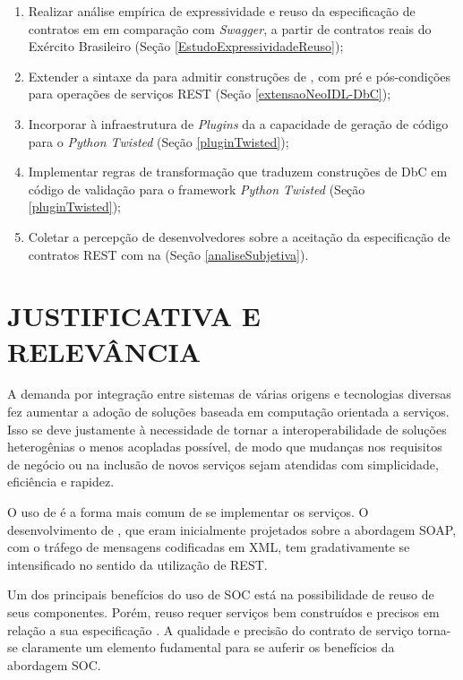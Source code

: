 \begin{enumerate}[(OE1)]
  \item Realizar análise empírica de expressividade e reuso da especificação de
  contratos em \neoidl{} em comparação com \textit{Swagger}, a partir de contratos
  reais do Exército Brasileiro (Seção \ref{EstudoExpressividadeReuso}); 
  \item Extender a sintaxe da \neoidl{} para admitir construções de 
  \designbycontract, com pré e pós-condições para operações de serviços REST
  (Seção \ref{extensaoNeoIDL-DbC});
  \item Incorporar à infraestrutura de \textit{Plugins} da
  \neoidl{} a capacidade de geração de código para o \framework{} \textit{Python
 Twisted} (Seção \ref{pluginTwisted});
  \item Implementar regras de transformação que traduzem construções de DbC
 \neoidl{} em código de validação para o framework \textit{Python
 Twisted} (Seção \ref{pluginTwisted});%
  \item Coletar a percepção de desenvolvedores sobre a aceitação da
  especificação de contratos REST com \designbycontract{} na \neoidl{} (Seção
  \ref{analiseSubjetiva}).
\end{enumerate}


\section{JUSTIFICATIVA E RELEVÂNCIA}
\label{JustificativaRelevancia}
\vspace{-6mm}

A demanda por integração entre sistemas de várias origens e tecnologias diversas
fez aumentar a adoção de soluções baseada em computação orientada a serviços.
Isso se deve justamente à necessidade de tornar a interoperabilidade de soluções
heterogênias o menos acopladas possível, de modo que mudanças nos requisitos de negócio ou
na inclusão de novos serviços sejam atendidas com simplicidade,
eficiência e rapidez.

O uso de \ws{}\cite{erl2009web} é a forma mais comum de se implementar os serviços. O
desenvolvimento de \ws{}, que eram inicialmente projetados sobre a abordagem
SOAP, com o tráfego de mensagens codificadas em XML\cite{XML}, tem gradativamente
se intensificado no sentido da utilização de REST\cite{fielding2000architectural}.

Um dos principais benefícios do uso de SOC está na possibilidade de reuso de
seus componentes. Porém, reuso requer serviços bem construídos e precisos em
relação a sua especificação \cite{jazequel1997design}. A qualidade e precisão do
contrato de serviço torna-se claramente um elemento fudamental para se auferir
os benefícios da abordagem SOC.

